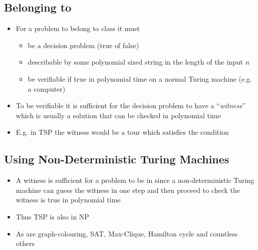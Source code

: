 
\begin{slide}
\section[-0.5]{Belonging to }

\begin{PauseHighLight}
  \begin{itemize}
  \item For a problem to belong to class  it must
    \begin{itemize}
    \item be a decision problem (true of false)\pause
    \item describable by some polynomial sized string in the length of
      the input $n$\pause
    \item be verifiable if true in polynomial time on a normal Turing
      machine (e.g. a computer)\pause
    \end{itemize}
  \item To be verifiable it is sufficient for the decision problem to
    have a ``\emph{witness}'' which is usually a solution that can be
    checked in polynomial time\pause
  \item E.g. in TSP the witness would be a tour which satisfies the
    condition\pause
  \end{itemize}
\end{PauseHighLight}

\end{slide}



\begin{slide}
\section{Using Non-Deterministic Turing Machines}

\begin{PauseHighLight}
  \begin{itemize}
  \item A witness is sufficient for a problem to be in  since a
    non-deterministic Turing machine can guess the witness in one step
    and then proceed to check the witness is true in polynomial
    time\pause
  \item Thus TSP is also in NP\pause
  \item As are graph-colouring, SAT, Max-Clique, Hamilton cycle and
    countless others\pause
  \end{itemize}
\end{PauseHighLight}

\end{slide}


